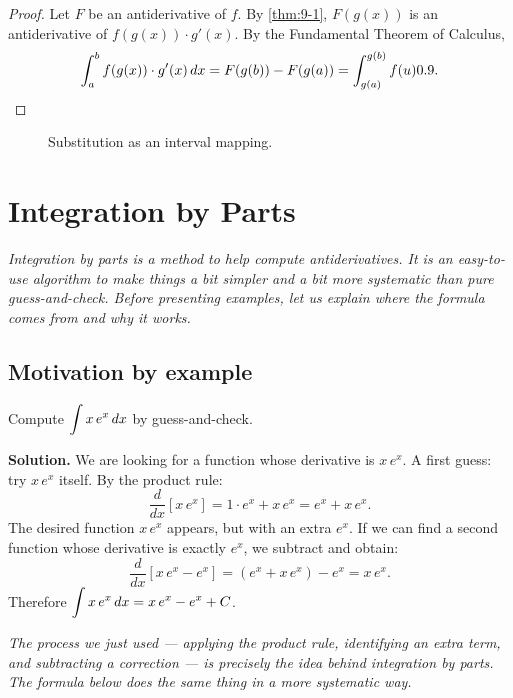 \begin{proof}
Let $F$ be an antiderivative of $f$.  By \cref{thm:9-1}, $F(g(x))$ is an antiderivative of $f(g(x))\cdot g'(x)$.  By the Fundamental Theorem of Calculus,
\[
  \int_{a}^{b} f(g(x))\cdot g'(x)\,dx = F(g(b)) - F(g(a)) = \int_{g(a)}^{g(b)} f(u)0.9.
\]
\end{proof}

\begin{figure}[ht]
  \centering
  
  \caption{Substitution as an interval mapping.}
  \label{fig:substitution-interval-map}
\end{figure}

\section{Integration by Parts}
\label{sec:9.4}

\textit{Integration by parts is a method to help compute antiderivatives.  It is an easy-to-use algorithm to make things a bit simpler and a bit more systematic than pure guess-and-check.  Before presenting examples, let us explain where the formula comes from and why it works.}

\subsection*{Motivation by example}

\begin{example}
\label{ex:9-7}
Compute $\displaystyle\int x\,e^{x}\,dx$ by guess-and-check.

\textbf{Solution.}  We are looking for a function whose derivative is $x\,e^{x}$.  A first guess: try $x\,e^{x}$ itself.  By the product rule:
\[
  \frac{d}{dx}\!\left[x\,e^{x}\right] = 1\cdot e^{x} + x\,e^{x} = e^{x} + x\,e^{x}.
\]
The desired function $x\,e^{x}$ appears, but with an extra $e^{x}$.  If we can find a second function whose derivative is exactly $e^{x}$, we subtract and obtain:
\[
  \frac{d}{dx}\!\left[x\,e^{x} - e^{x}\right] = (e^{x} + x\,e^{x}) - e^{x} = x\,e^{x}.
\]
Therefore $\displaystyle\int x\,e^{x}\,dx = x\,e^{x} - e^{x} + C$.
\end{example}

\textit{The process we just used --- applying the product rule, identifying an extra term, and subtracting a correction --- is precisely the idea behind integration by parts.  The formula below does the same thing in a more systematic way.}

